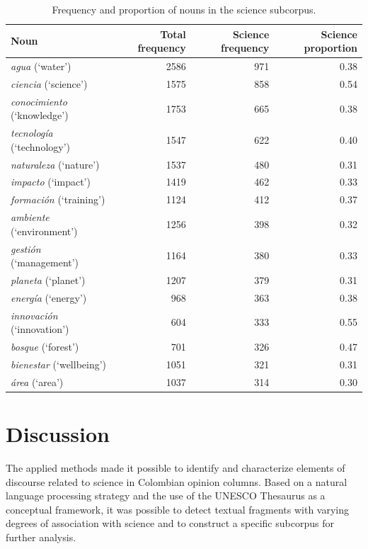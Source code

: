 \documentclass[11pt,a4paper]{article}
\begin{document}
\begin{table}[H]
	\centering
	\caption{Frequency and proportion of nouns in the science subcorpus.}
	\begin{tabular}{lrrr}
		\toprule
		\textbf{Noun} & \textbf{Total frequency} & \textbf{Science frequency} & \textbf{Science proportion} \\
		\midrule
		\textit{agua} (`water')              & 2586 & 971 & 0.38 \\
		\textit{ciencia} (`science')         & 1575 & 858 & 0.54 \\
		\textit{conocimiento} (`knowledge')  & 1753 & 665 & 0.38 \\
		\textit{tecnología} (`technology')   & 1547 & 622 & 0.40 \\
		\textit{naturaleza} (`nature')       & 1537 & 480 & 0.31 \\
		\textit{impacto} (`impact')          & 1419 & 462 & 0.33 \\
		\textit{formación} (`training')      & 1124 & 412 & 0.37 \\
		\textit{ambiente} (`environment')    & 1256 & 398 & 0.32 \\
		\textit{gestión} (`management')      & 1164 & 380 & 0.33 \\
		\textit{planeta} (`planet')          & 1207 & 379 & 0.31 \\
		\textit{energía} (`energy')          & 968  & 363 & 0.38 \\
		\textit{innovación} (`innovation')   & 604  & 333 & 0.55 \\
		\textit{bosque} (`forest')           & 701  & 326 & 0.47 \\
		\textit{bienestar} (`wellbeing')     & 1051 & 321 & 0.31 \\
		\textit{área} (`area')               & 1037 & 314 & 0.30 \\
		\bottomrule
	\end{tabular}
	
	\label{tab:sustantivos_ciencia}
\end{table}

	
\section{Discussion}
	
The applied methods made it possible to identify and characterize elements of discourse related to science in Colombian opinion columns. Based on a natural language processing strategy and the use of the UNESCO Thesaurus as a conceptual framework, it was possible to detect textual fragments with varying degrees of association with science and to construct a specific subcorpus for further analysis.
\end{document}
